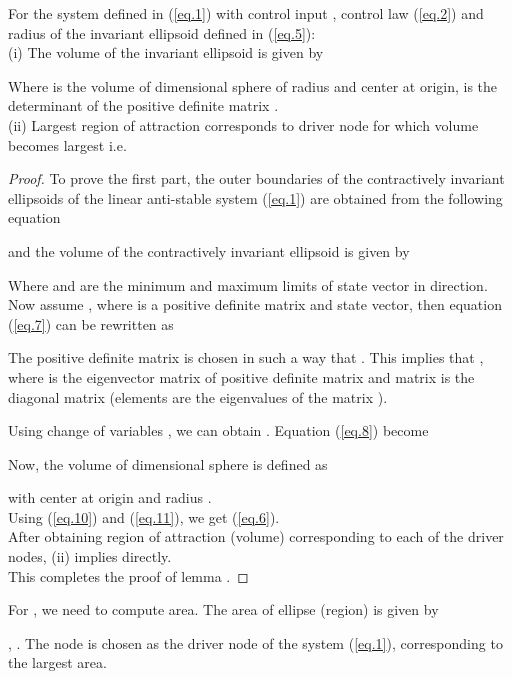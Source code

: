 \documentclass[conference]{IEEEtran}
\begin{document}
\begin{lm} For the system defined in (\ref{eq.1}) with control input , control law (\ref{eq.2}) and radius of the invariant ellipsoid defined in (\ref{eq.5}): \\
 (i) The volume of the invariant ellipsoid is given by
 	
  		Where  is the volume of dimensional sphere  of radius  and center at origin,  is the determinant of the positive definite matrix . \\
 (ii) Largest region of attraction corresponds to  driver node for which volume becomes largest i.e. \\
  	
  	\end{lm}
  \begin{proof} To prove the first part, the outer boundaries of the contractively invariant ellipsoids  of the linear anti-stable system (\ref{eq.1}) are obtained from the following equation
  
  and the volume of the contractively invariant ellipsoid is given by
  
  Where  and  are the minimum and maximum limits of state vector  in  direction. \\
  Now assume , where  is a positive definite matrix and  state vector, then equation (\ref{eq.7}) can be rewritten as
  
  The positive definite matrix  is chosen in such a way that  . This implies that , where  is the eigenvector matrix of positive definite matrix  and matrix  is the diagonal matrix (elements are the eigenvalues of the matrix ).
  \par Using change of variables , we can obtain .
   Equation (\ref{eq.8}) become
  
  Now, the volume of dimensional sphere  is defined as
  
  with center at origin and radius . \\
   Using (\ref{eq.10}) and (\ref{eq.11}), we get (\ref{eq.6}). \\
  After obtaining region of attraction (volume) corresponding to each of the driver nodes, (ii) implies directly. \\
  This completes the proof of lemma .
  \end{proof}
  \begin{corol}
  	For , we need to compute area. The area of ellipse (region) is given by
  	
  	, . The  node is chosen as the driver node of the system (\ref{eq.1}), corresponding to the largest area.
  	\end{corol}
\end{document}
